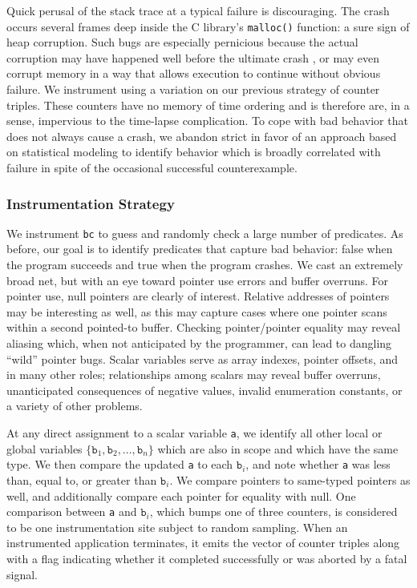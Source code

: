 Quick perusal of the stack trace at a typical failure is discouraging.
The crash occurs several frames deep inside the C library's
\texttt{malloc()} function: a sure sign of heap corruption.  Such bugs
are especially pernicious because the actual corruption may have
happened well before the ultimate crash \cite{Eisenstadt1993b}, or may
even corrupt memory in a way that allows execution to continue without
obvious failure.  We instrument using a variation on our previous
strategy of counter triples.  These counters have no memory of time
ordering and is therefore are, in a sense, impervious to the
time-lapse complication.  To cope with bad behavior that does not
always cause a crash, we abandon strict  in favor of an approach based on
statistical modeling to identify behavior which is broadly correlated
with failure in spite of the occasional successful counterexample.

\subsubsection{Instrumentation Strategy}

We instrument \texttt{bc} to guess and randomly check a large number
of predicates.  As before, our goal is to identify predicates
that capture bad behavior: false when the program succeeds and true
when the program crashes.  We cast an extremely broad net, but with an
eye toward pointer use errors and buffer overruns.  For pointer use,
null pointers are clearly of interest.  Relative addresses of pointers
may be interesting as well, as this may capture cases where one
pointer scans within a second pointed-to buffer.  Checking
pointer/pointer equality may reveal aliasing which, when not
anticipated by the programmer, can lead to dangling ``wild'' pointer
bugs.  Scalar variables serve as array indexes, pointer offsets, and
in many other roles; relationships among scalars may reveal buffer
overruns, unanticipated consequences of negative values, invalid
enumeration constants, or a variety of other problems.

At any direct assignment to a scalar variable \texttt{a}, we identify
all other local or global variables $\{ \mathtt{b}_1, \mathtt{b}_2,
\dots, \mathtt{b}_n \}$ which are also in scope and which have the
same type.  We then compare the updated \texttt{a} to each
$\mathtt{b}_i$, and note whether \texttt{a} was less than, equal to,
or greater than $\mathtt{b}_i$.  We compare pointers to same-typed
pointers as well, and additionally compare each pointer for equality
with null.  One comparison between \texttt{a} and $\mathtt{b}_i$,
which bumps one of three counters, is considered to be one
instrumentation site subject to random sampling.  When an instrumented
application terminates, it emits the vector of counter triples along
with a flag indicating whether it completed successfully or was
aborted by a fatal signal.

